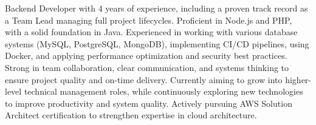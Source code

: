

\begin{cvparagraph}
    \quad
    Backend Developer with 4 years of experience, including a proven track record as a Team Lead managing full project lifecycles. Proficient in Node.js and PHP, with a solid foundation in Java. Experienced in working with various database systems (MySQL, PostgreSQL, MongoDB), implementing CI/CD pipelines, using Docker, and applying performance optimization and security best practices. Strong in team collaboration, clear communication, and systems thinking to ensure project quality and on-time delivery.
    \vspace{0.5em} %
    \newline \hspace*{1em} Currently aiming to grow into higher-level technical management roles, while continuously exploring new technologies to improve productivity and system quality. Actively pursuing AWS Solution Architect certification to strengthen expertise in cloud architecture.
\end{cvparagraph}
